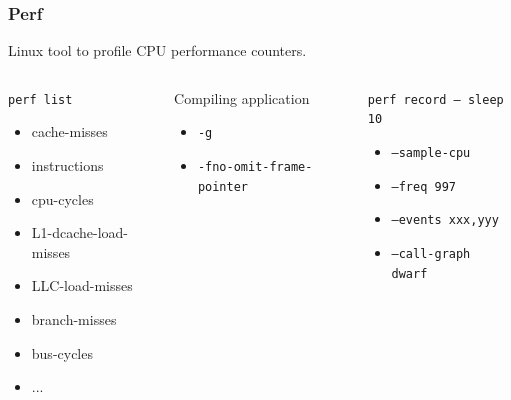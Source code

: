 \documentclass[aspectratio=169]{beamer}
\begin{document}
\begin{frame}
	\frametitle{Perf}
    Linux tool to profile CPU performance counters.
    \break
    \break

	\begin{columns}
        \begin{block}{\texttt{perf list}}
            \begin{itemize}
                \item cache-misses
                \item instructions
                \item cpu-cycles
                \item L1-dcache-load-misses
                \item LLC-load-misses
                \item branch-misses
                \item bus-cycles
                \item ...
            \end{itemize}
        \end{block}

        \begin{block}{Compiling application}
            \begin{itemize}
                \item \texttt{-g}
                \item \texttt{-fno-omit-frame-pointer}
            \end{itemize}
        \end{block}

        \begin{block}{\texttt{perf record -- sleep 10}}
            \begin{itemize}
                \item \texttt{--sample-cpu}
                \item \texttt{--freq 997}
                \item \texttt{--events xxx,yyy}
                \item \texttt{--call-graph dwarf}
            \end{itemize}
        \end{block}

	\end{columns}

\end{frame}
\end{document}
